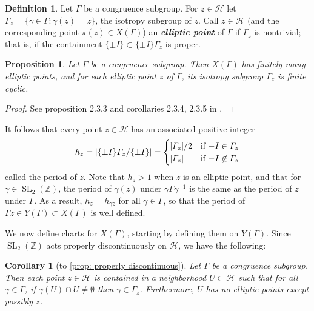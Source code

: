 \documentclass[10pt,leqno,twoside]{article}
\theoremstyle{plain}
\newtheorem{proposition}[lem]{Proposition}
\newtheorem{corollary}[lem]{Corollary}
\theoremstyle{definition}
\newtheorem{definition/}[lem]{Definition}
\newenvironment{definition}
  {\renewcommand{\qedsymbol}{\textdagger}%
   \pushQED{\qed}\begin{definition/}}
  {\popQED\end{definition/}}
\numberwithin{equation}{section}
\numberwithin{lem}{section}
\newcommand{\textib}[1]{\textbf{\textit{#1\index{#1}}}} %
\DeclareMathOperator{\SL}{SL}
\newcommand{\slz}{\SL_2(\mathbb{Z})}
\begin{document}
\begin{definition}
    Let $\varGamma$ be a congruence subgroup. For $z\in\mathcal H$ let $\varGamma_z = \{\gamma\in\varGamma : \gamma(z) = z\}$, the isotropy subgroup of $z$. Call $z\in\mathcal H$ (and the corresponding point $\pi(z)\in X(\varGamma)$) an \textib{elliptic point} of $\varGamma$ if $\varGamma_z$ is nontrivial; that is, if the containment $\{\pm I\}\subset \{\pm I\}\varGamma_z$ is proper.
\end{definition}

\begin{proposition}\label{prop: cyclic isotropy subgp}
    Let $\varGamma$ be a congruence subgroup. Then $X(\varGamma)$ has finitely many elliptic points, and for each elliptic point $z$ of $\varGamma$, its isotropy subgroup $\varGamma_z$ is finite cyclic.
\end{proposition}
\begin{proof}
    See proposition 2.3.3 and corollaries 2.3.4, 2.3.5 in \cite{diamond}.
\end{proof}

It follows that every point $z\in\mathcal H$ has an associated positive integer
\[h_z = \abs{\{\pm I\}\varGamma_z/\{\pm I\}} = \begin{cases}
    \abs{\varGamma_z}/2 & \text{if $-I\in\varGamma_z$}\\
    \abs{\varGamma_z} & \text{if $-I\not\in\varGamma_z$}
\end{cases}\] called the period of $z$. Note that $h_z>1$ when $z$ is an elliptic point, and that for $\gamma\in\slz$, the period of $\gamma(z)$ under $\gamma\varGamma\gamma^{-1}$ is the same as the period of $z$ under $\varGamma$. As a result, $h_z = h_{\gamma z}$ for all $\gamma\in\varGamma$, so that the period of $\varGamma z\in Y(\varGamma)\subset X(\varGamma)$ is well defined.

We now define charts for $X(\varGamma)$, starting by defining them on $Y(\varGamma)$. Since $\slz$ acts properly discontinuously on $\mathcal H$, we have the following:

\begin{corollary}[to \cref{prop: properly discontinuous}]
    Let $\varGamma$ be a congruence subgroup. Then each point $z\in\mathcal H$ is contained in a neighborhood $U\subset \mathcal H$ such that for all $\gamma\in\varGamma$, if $\gamma(U)\cap U \neq \emptyset$ then $\gamma\in\varGamma_z$. Furthermore, $U$ has no elliptic points except possibly $z$.
\end{corollary}
\end{document}
